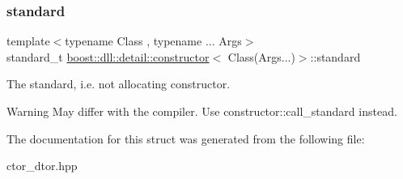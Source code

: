 \subsubsection{\texorpdfstring{standard}{standard}}
{\footnotesize\ttfamily template$<$typename Class , typename ... Args$>$ \\
standard\+\_\+t \hyperlink{a01352}{boost\+::dll\+::detail\+::constructor}$<$ Class(Args...)$>$\+::standard}



The standard, i.\+e. not allocating constructor. 

\begin{DoxyWarning}{Warning}
May differ with the compiler. Use constructor\+::call\+\_\+standard instead. 
\end{DoxyWarning}


The documentation for this struct was generated from the following file\+:\begin{DoxyCompactItemize}
\item 
ctor\+\_\+dtor.\+hpp\end{DoxyCompactItemize}
